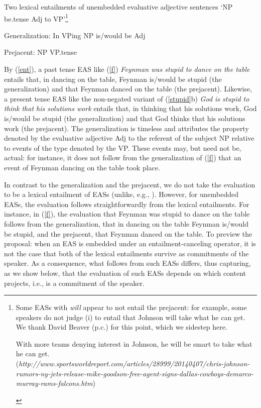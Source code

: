 \documentclass[11pt,fleqn]{article}
\newcommand{\6}{\mbox{$[\hspace*{-.6mm}[$}}
\newcommand{\9}{\mbox{$]\hspace*{-.6mm}]$}}
\begin{document}
\begin{exe}
\ex\label{ent} Two lexical entailments of unembedded evaluative adjective sentences `NP be{\sc .tense} Adj to VP'\footnote{Some EASs with {\em will} appear to not entail the prejacent: for example, some speakers do not judge (i) to entail that Johnson will take what he can get. We thank David Beaver (p.c.) for this point, which we sidestep here.
\begin{exe}
 With more teams denying interest in Johnson, he will be smart
to take what he can get. \\ ({\em http://www.sportsworldreport.com/articles/28999/20140407/chris-johnson-rumors-ny-jets-release-mike-goodson-free-agent-signs-dallas-cowboys-demarco-murray-rams-falcons.htm})
\end{exe}} 

\begin{xlist}

\ex Generalization: In VPing NP is/would be Adj

\ex Prejacent: NP VP{\sc .tense}

\end{xlist}
\end{exe}
By (\ref{ent}), a past tense EAS like (\ref{f}) {\em Feynman was stupid to dance on the table} entails that, in dancing on the table, Feynman is/would be stupid (the generalization) and that Feynman danced on the table (the prejacent). Likewise, a present tense EAS like the non-negated variant of (\ref{stupid}b) {\em God is stupid to think that his solutions work} entails that, in thinking that his solutions work, God is/would be stupid (the generalization) and that God thinks that his solutions work (the prejacent). The generalization is timeless and attributes the property denoted by the evaluative adjective Adj to the referent of the subject NP relative to events of the type denoted by the VP. These events may, but need not be, actual: for instance, it does not follow from the generalization of (\ref{f}) that an event of Feynman dancing on the table took place.

In contrast to the generalization and the prejacent, we do not take the evaluation to be a lexical entailment of EASs (unlike, e.g., \citealt{barker02}). However, for unembedded EASs, the evaluation follows straightforwardly from the lexical entailments. For instance, in (\ref{f}), the evaluation that Feynman was stupid to dance on the table follows from the generalization, that in dancing on the table Feynman is/would be stupid, and the prejacent, that Feynman danced on the table. To preview the proposal: when an EAS is embedded under an entailment-canceling operator, it is not the case that both of the lexical entailments survive as commitments of the speaker. As a consequence, what follows from such EASs differs, thus capturing, as we show below, that the evaluation of such EASs depends on which content projects, i.e., is a commitment of the speaker.
\end{document}

